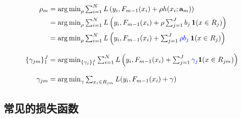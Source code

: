 \begin{frame}
    \begin{align*}
        \rho_m & = \operatorname{arg \, min}_\rho \textstyle \sum_{i=1}^N L \left ( y_i, F_{m-1}(x_i) + \rho h(x_i; \mathbf{a}_m) \right) \\
               & = \operatorname{arg \, min}_\rho \textstyle \sum_{i=1}^N L \left ( y_i, F_{m-1}(x_i) + \rho \sum_{j=1}^J b_j \, \mathbf{1}(x \in R_j) \right) \\
               & = \operatorname{arg \, min}_\rho \textstyle \sum_{i=1}^N L \left ( y_i, F_{m-1}(x_i) + \sum_{j=1}^J \textcolor{blue}{\rho b_j} \, \mathbf{1}(x \in R_j) \right) \\[2ex]
        \{\gamma_{jm}\}_1^J &= \operatorname{arg \, min}_{\{\gamma_j\}_1^J} \textstyle \sum_{i=1}^N L \left ( y_i, F_{m-1}(x_i) + \sum_{j=1}^J \textcolor{blue}{\gamma_j} \mathbf{1}(x \in R_{jm}) \right ) \\[2ex]
        \gamma_{jm} &= \operatorname{arg \, min}_{\gamma} \textstyle \sum_{x_i \in R_{jm}} L(y_i, F_{m-1}(x_i) + \gamma) \\
    \end{align*}
\end{frame}


\subsection{常见的损失函数}



